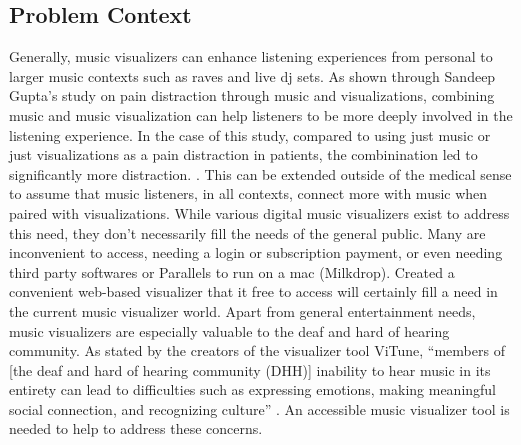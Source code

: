 \documentclass[10pt,twocolumn]{article}
\begin{document}
\subsection{Problem Context}
Generally, music visualizers can enhance listening experiences from personal to larger music contexts such as raves and live dj sets. As shown through Sandeep Gupta’s study on pain distraction through music and visualizations, combining music and music visualization can help listeners to be more deeply involved in the listening experience. In the case of this study, compared to using just music or just visualizations as a pain distraction in patients, the combinination led to significantly more distraction. \cite{gupta_distraction_2019}. This can be extended outside of the medical sense to assume that music listeners, in all contexts,  connect more with music when paired with visualizations. While various digital music visualizers exist to address this need, they don’t necessarily fill the needs of the general public. Many are inconvenient to access, needing a login or subscription payment, or even needing third party softwares or Parallels to run on a mac (Milkdrop). Created a convenient web-based visualizer that it free to access will certainly fill a need in the current music visualizer world. 
Apart from general entertainment needs, music visualizers are especially valuable to the deaf and hard of hearing community. As stated by the creators of the visualizer tool ViTune, “members of [the deaf and hard of hearing community (DHH)] inability to hear music in its entirety can lead to difficulties such as expressing emotions, making meaningful social connection, and recognizing culture” \cite{deja_vitune_2020}. An accessible music visualizer tool is needed to help to address these concerns.
\end{document}
